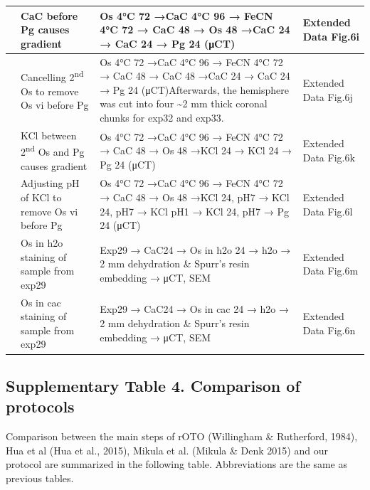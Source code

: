 \documentclass{article}
\begin{document}
\begin{longtable}{>{\raggedright\arraybackslash}p{0.6cm}>{\raggedright\arraybackslash}p{3cm}>{\raggedright\arraybackslash}p{7.3cm}>{\raggedright\arraybackslash}p{2.2cm}}
28 & CaC before Pg causes gradient & Os 4°C 72 →CaC 4°C 96 → FeCN 4°C 72 → CaC 48 → Os 48 →CaC 24 → CaC 24 → Pg 24 (μCT) & Extended Data Fig.6i \\ \midrule
29 & Cancelling 2\textsuperscript{nd} Os to remove Os vi before Pg & Os 4°C 72 →CaC 4°C 96 → FeCN 4°C 72 → CaC 48 → CaC 48 →CaC 24 → CaC 24 → Pg 24 (μCT)\newline Afterwards, the hemisphere was cut into four \textasciitilde{}2 mm thick coronal chunks for exp32 and exp33. & Extended Data Fig.6j \\ \midrule
30 & KCl between 2\textsuperscript{nd} Os and Pg causes gradient & Os 4°C 72 →CaC 4°C 96 → FeCN 4°C 72 → CaC 48 → Os 48 →KCl 24 → KCl 24 → Pg 24 (μCT) & Extended Data Fig.6k \\ \midrule
31 & Adjusting pH of KCl to remove Os vi before Pg & Os 4°C 72 →CaC 4°C 96 → FeCN 4°C 72 → CaC 48 → Os 48 →KCl 24, pH7 → KCl 24, pH7 → KCl pH1 → KCl 24, pH7 → Pg 24 (μCT) & Extended Data Fig.6l \\ \midrule
32 & Os in h2o staining of sample from exp29 & Exp29 → CaC24 → Os in h2o 24 → h2o → 2 mm dehydration \& Spurr’s resin embedding → μCT, SEM & Extended Data Fig.6m \\ \midrule
33 & Os in cac staining of sample from exp29 & Exp29 → CaC24 → Os in cac 24 → h2o → 2 mm dehydration \& Spurr’s resin embedding → μCT, SEM & Extended Data Fig.6n \\ \midrule
\bottomrule
\end{longtable}

\subsection*{Supplementary Table 4.  Comparison of protocols}

Comparison between the main steps of rOTO (Willingham \& Rutherford, 1984), Hua et al (Hua et al., 2015), Mikula et al. (Mikula \& Denk 2015) and our protocol are summarized in the following table. Abbreviations are the same as previous tables. 
\end{document}
